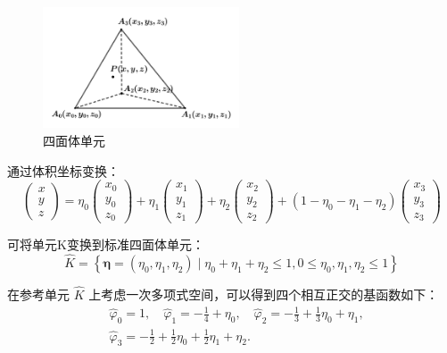 \documentclass[a4paper, 12pt, UTF8]{ctexart}
\begin{document}
\begin{figure}[!ht]
\centering
\includegraphics[width=0.52\textwidth]{images/1.png}
\caption{四面体单元}
\label{tetrahedron}
\end{figure}

通过体积坐标变换：
\begin{equation}
\left(\begin{array}{l}
x \\
y \\
z
\end{array}\right)=\eta_{0}\left(\begin{array}{l}
x_{0} \\
y_{0} \\
z_{0}
\end{array}\right)+\eta_{1}\left(\begin{array}{l}
x_{1} \\
y_{1} \\
z_{1}
\end{array}\right)+\eta_{2}\left(\begin{array}{l}
x_{2} \\
y_{2} \\
z_{2}
\end{array}\right)+\left(1-\eta_{0}-\eta_{1}-\eta_{2}\right)\left(\begin{array}{l}
x_{3} \\
y_{3} \\
z_{3}
\end{array}\right)
\end{equation}

可将单元K变换到标准四面体单元：
\begin{equation}
\hat{K}=\left\{\boldsymbol{\eta}=\left(\eta_{0}, \eta_{1}, \eta_{2}\right) \mid \eta_{0}+\eta_{1}+\eta_{2} \leqslant 1, 0 \leqslant \eta_{0}, \eta_{1}, \eta_{2} \leqslant 1\right\}
\end{equation}

在参考单元 $\hat{K}$ 上考虑一次多项式空间，可以得到四个相互正交的基函数如下：
\begin{equation}	
\begin{split}
&\hat{\varphi}_{0} = 1, \quad
\hat{\varphi}_{1} = -\frac{1}{4} + \eta_{0}, \quad
\hat{\varphi}_{2} = -\frac{1}{3} + \frac{1}{3} \eta_{0} + \eta_{1}, \\
&\hat{\varphi}_{3} = -\frac{1}{2} + \frac{1}{2} \eta_{0} + \frac{1}{2} \eta_{1} + \eta_{2}.
\end{split}
\end{equation}
\end{document}
